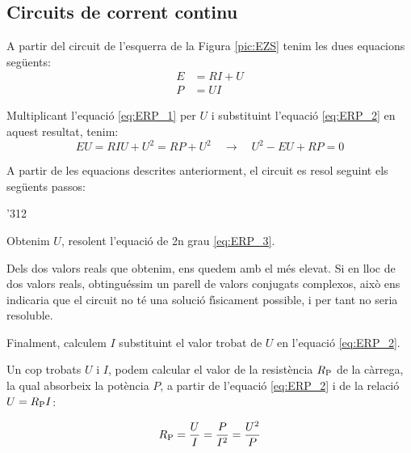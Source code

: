 \begin{center}
   
     \label{pic:EZS}
\end{center}

\subsection{Circuits de corrent continu}

A partir del circuit de l'esquerra de la Figura \vref{pic:EZS} tenim les dues equacions seg\"{u}ents:
\begin{align}
   E &= R I + U \label{eq:ERP_1} \\
   P &= U I     \label{eq:ERP_2}
\end{align}

Multiplicant l'equaci\'{o} \eqref{eq:ERP_1} per $U$ i substituint l'equaci\'{o} \eqref{eq:ERP_2} en aquest resultat, tenim:
\begin{equation}
   E U = R I U + U^2 = R P + U^2 \quad \rightarrow \quad U^2 - E U + R P = 0 \label{eq:ERP_3}
\end{equation}

A partir de les equacions descrites anteriorment, el circuit es resol seguint els seg\"{u}ents passos:
\begin{dingautolist}{'312}
   \item Obtenim $U$, resolent l'equaci\'{o} de 2n grau \eqref{eq:ERP_3}.
   \item Dels dos valors reals que obtenim, ens quedem amb el m\'{e}s elevat. Si en lloc de dos valors reals, obtingu\'{e}ssim
   un parell de valors conjugats complexos, aix\`{o} ens indicaria que el circuit no t\'{e} una soluci\'{o} f\'{\i}sicament possible, i per tant no seria resoluble.
   \item Finalment, calculem $I$ substituint el valor trobat de $U$ en l'equaci\'{o} \eqref{eq:ERP_2}.
\end{dingautolist}

Un cop trobats $U$ i $I$, podem calcular el valor de la resist\`{e}ncia
$R_\mathrm{P}$ de la c\`{a}rrega, la qual absorbeix la pot\`{e}ncia $P$, a
partir de l'equaci\'{o} \eqref{eq:ERP_2} i de la relaci\'{o} $U =R_\mathrm{P}
I$:

\begin{equation}
   R_\mathrm{P} = \frac{U}{I} = \frac{P}{I^2} = \frac{U^2}{P}
\end{equation}

